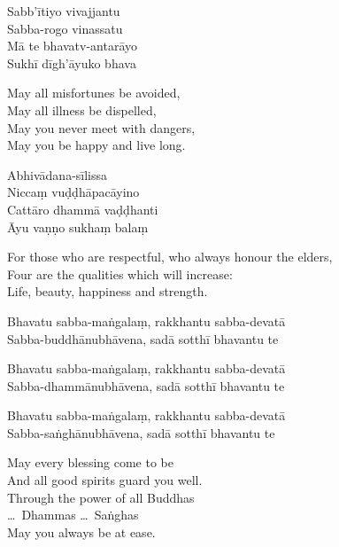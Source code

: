 \begin{paritta}

Sabb'ītiyo vivajjantu\\
Sabba-rogo vinassatu\\
Mā te bhavatv-antarāyo\\
Sukhī dīgh'āyuko bhava

\begin{english}
  May all misfortunes be avoided,\\
  May all illness be dispelled,\\
  May you never meet with dangers,\\
  May you be happy and live long.
\end{english}


Abhivādana-sīlissa\\
Niccaṃ vuḍḍhāpacāyino\\
Cattāro dhammā vaḍḍhanti\\
Āyu vaṇṇo sukhaṃ balaṃ\hfill {}

\begin{english}
  For those who are respectful, who always honour the elders,\\
  Four are the qualities which will increase:\\
  Life, beauty, happiness and strength.
\end{english}


Bhavatu sabba-maṅgalaṃ, rakkhantu sabba-devatā\\
Sabba-buddhānubhāvena, sadā sotthī bhavantu te

\clearpage

Bhavatu sabba-maṅgalaṃ, rakkhantu sabba-devatā\\
Sabba-dhammānubhāvena, sadā sotthī bhavantu te

Bhavatu sabba-maṅgalaṃ, rakkhantu sabba-devatā\\
Sabba-saṅghānubhāvena, sadā sotthī bhavantu te

\begin{english}
  May every blessing come to be\\
  And all good spirits guard you well.\\
  Through the power of all Buddhas\\
  \ldots\ Dhammas \ldots\ Saṅghas\\
  May you always be at ease.
\end{english}

\end{paritta}

